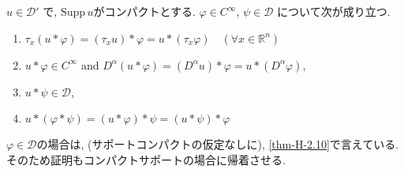 \begin{tcolorbox}[mybox]
\begin{thm}\cite[Theorem 6.35]{Rud}
\label{thm-H-3.3}
\( u \in \mathcal{D}' \) で,  \(\mathrm{Supp}\, u \)がコンパクトとする. 
\( \varphi \in C^\infty \), \( \psi \in \mathcal{D} \)
について次が成り立つ. 
\begin{enumerate}[label=$(\alph*)$]
\item \( \tau_x(u \ast \varphi) = (\tau_x u) \ast \varphi = u \ast(\tau_x \varphi) \quad (\forall x \in \mathbb{R}^n) \)
\item \( u \ast\varphi \in C^\infty \) and \( D^\alpha (u \ast \varphi) = (D^\alpha u) \ast\varphi = u \ast (D^\alpha \varphi) \),
\item \( u \ast \psi \in \mathcal{D} \),
\item \( u \ast (\varphi * \psi) = (u \ast \varphi) \ast \psi = (u \ast \psi) \ast \varphi \)
\end{enumerate}
\end{thm}

\end{tcolorbox}
\( \varphi \in \mathcal{D} \)の場合は, (サポートコンパクトの仮定なしに), \ref{thm-H-2.10}で言えている. 
そのため証明もコンパクトサポートの場合に帰着させる.
\bigskip

